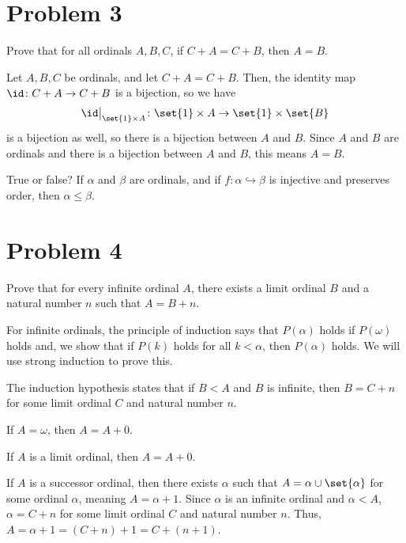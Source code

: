 \documentclass[10pt]{mypackage}
\begin{document}
\section{Problem 3}%
\begin{problem}
  Prove that for all ordinals $A,B,C$, if $C+A = C+B$, then $A=B$.
\end{problem}
\begin{solution}
  Let $A,B,C$ be ordinals, and let $C+A = C+B$. Then, the identity map $\id\colon C+A \rightarrow C+B$ is a bijection, so we have
  \begin{align*}
    \id\bigr\vert_{\set{1}\times A}\colon \set{1}\times A \rightarrow \set{1}\times \set{B}
  \end{align*}
  is a bijection as well, so there is a bijection between $A$ and $B$. Since $A$ and $B$ are ordinals and there is a bijection between $A$ and $B$, this means $A = B$.
\end{solution}
\begin{question}
  True or false? If $\alpha$ and $\beta$ are ordinals, and if $f: \alpha \hookrightarrow \beta$ is injective and preserves order, then $\alpha \leq \beta$.
\end{question}
\section{Problem 4}%
\begin{problem}
  Prove that for every infinite ordinal $A$, there exists a limit ordinal $B$ and a natural number $n$ such that $A = B + n$.
\end{problem}
\begin{solution}
  For infinite ordinals, the principle of induction says that $P(\alpha)$ holds if $P(\omega)$ holds and, we show that if $P(k)$ holds for all $k < \alpha$, then $P(\alpha)$ holds. We will use strong induction to prove this.\newline

  The induction hypothesis states that if $B < A$ and $B$ is infinite, then $B = C+n$ for some limit ordinal $C$ and natural number $n$.\newline

  If $A = \omega$, then $A = A+ 0$.\newline

  If $A$ is a limit ordinal, then $A = A + 0$.\newline

  If $A$ is a successor ordinal, then there exists $\alpha$ such that $A = \alpha \cup \set{\alpha}$ for some ordinal $\alpha$, meaning $A = \alpha + 1$. Since $\alpha$ is an infinite ordinal and $\alpha < A$, $\alpha = C + n$ for some limit ordinal $C$ and natural number $n$. Thus, $A = \alpha + 1 = \left(C+n\right)+1=C + \left(n+1\right)$.
\end{solution}
\end{document}
